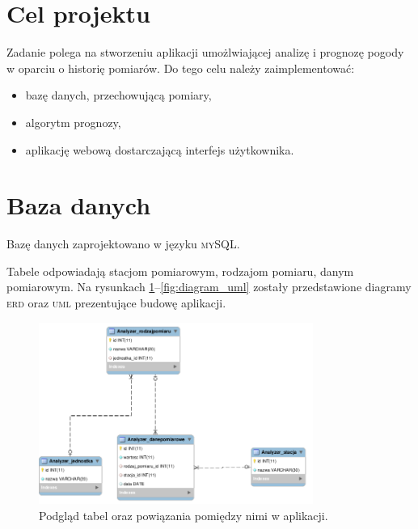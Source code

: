 \documentclass[11pt, a4paper, oneside]{mwart}
\begin{document}


\newpage
\thispagestyle{empty}

\tableofcontents
\newpage


\section{Cel projektu}

Zadanie polega na stworzeniu aplikacji umożlwiającej analizę i prognozę pogody w oparciu o historię pomiarów. Do tego celu należy zaimplementować: 
\begin{itemize}
  \item  bazę danych, przechowującą pomiary,
  \item algorytm prognozy,
  \item aplikację webową dostarczającą interfejs użytkownika.
\end{itemize}


\section{Baza danych}
Bazę danych zaprojektowano w języku \textsc{mySQL}.

Tabele odpowiadają stacjom pomiarowym, rodzajom pomiaru, danym pomiarowym. Na rysunkach \ref{fig:diagram_eer}--\ref{fig:diagram_uml} zostały przedstawione diagramy \textsc{erd} oraz \textsc{uml} prezentujące budowę aplikacji.

\begin{figure}[htbp]
  \centering
  \includegraphics[width=0.8\textwidth]{./diagramEER}
  \caption{Podgląd tabel oraz powiązania pomiędzy nimi w aplikacji.}
  \label{fig:diagram_eer}
\end{figure}
\end{document}
